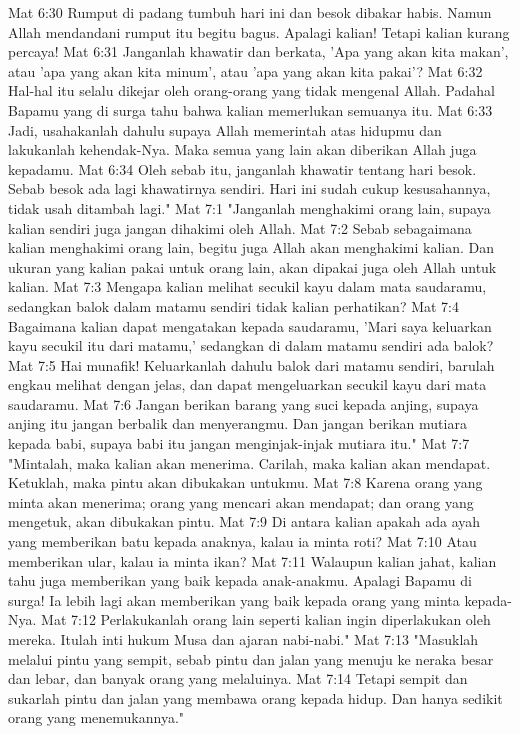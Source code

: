 Mat 6:30  Rumput di padang tumbuh hari ini dan besok dibakar habis. Namun Allah mendandani rumput itu begitu bagus. Apalagi kalian! Tetapi kalian kurang percaya!
Mat 6:31  Janganlah khawatir dan berkata, 'Apa yang akan kita makan', atau 'apa yang akan kita minum', atau 'apa yang akan kita pakai'?
Mat 6:32  Hal-hal itu selalu dikejar oleh orang-orang yang tidak mengenal Allah. Padahal Bapamu yang di surga tahu bahwa kalian memerlukan semuanya itu.
Mat 6:33  Jadi, usahakanlah dahulu supaya Allah memerintah atas hidupmu dan lakukanlah kehendak-Nya. Maka semua yang lain akan diberikan Allah juga kepadamu.
Mat 6:34  Oleh sebab itu, janganlah khawatir tentang hari besok. Sebab besok ada lagi khawatirnya sendiri. Hari ini sudah cukup kesusahannya, tidak usah ditambah lagi."
Mat 7:1  "Janganlah menghakimi orang lain, supaya kalian sendiri juga jangan dihakimi oleh Allah.
Mat 7:2  Sebab sebagaimana kalian menghakimi orang lain, begitu juga Allah akan menghakimi kalian. Dan ukuran yang kalian pakai untuk orang lain, akan dipakai juga oleh Allah untuk kalian.
Mat 7:3  Mengapa kalian melihat secukil kayu dalam mata saudaramu, sedangkan balok dalam matamu sendiri tidak kalian perhatikan?
Mat 7:4  Bagaimana kalian dapat mengatakan kepada saudaramu, 'Mari saya keluarkan kayu secukil itu dari matamu,' sedangkan di dalam matamu sendiri ada balok?
Mat 7:5  Hai munafik! Keluarkanlah dahulu balok dari matamu sendiri, barulah engkau melihat dengan jelas, dan dapat mengeluarkan secukil kayu dari mata saudaramu.
Mat 7:6  Jangan berikan barang yang suci kepada anjing, supaya anjing itu jangan berbalik dan menyerangmu. Dan jangan berikan mutiara kepada babi, supaya babi itu jangan menginjak-injak mutiara itu."
Mat 7:7  "Mintalah, maka kalian akan menerima. Carilah, maka kalian akan mendapat. Ketuklah, maka pintu akan dibukakan untukmu.
Mat 7:8  Karena orang yang minta akan menerima; orang yang mencari akan mendapat; dan orang yang mengetuk, akan dibukakan pintu.
Mat 7:9  Di antara kalian apakah ada ayah yang memberikan batu kepada anaknya, kalau ia minta roti?
Mat 7:10  Atau memberikan ular, kalau ia minta ikan?
Mat 7:11  Walaupun kalian jahat, kalian tahu juga memberikan yang baik kepada anak-anakmu. Apalagi Bapamu di surga! Ia lebih lagi akan memberikan yang baik kepada orang yang minta kepada-Nya.
Mat 7:12  Perlakukanlah orang lain seperti kalian ingin diperlakukan oleh mereka. Itulah inti hukum Musa dan ajaran nabi-nabi."
Mat 7:13  "Masuklah melalui pintu yang sempit, sebab pintu dan jalan yang menuju ke neraka besar dan lebar, dan banyak orang yang melaluinya.
Mat 7:14  Tetapi sempit dan sukarlah pintu dan jalan yang membawa orang kepada hidup. Dan hanya sedikit orang yang menemukannya."
